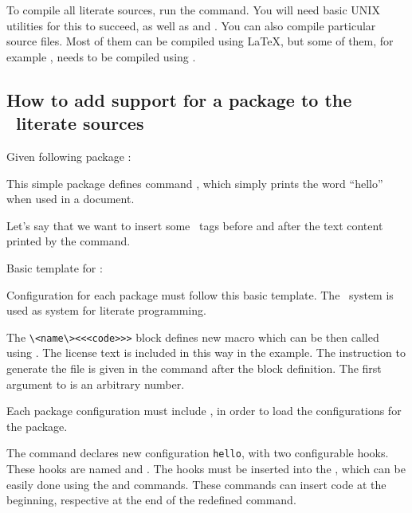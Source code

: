 To compile all literate sources, run the  command. You will need basic UNIX utilities 
for this to succeed, as well as  and . You can also compile particular source
files. Most of them can be compiled using \LaTeX, but some of them, for example , needs
to be compiled using .

\subsection{How to add support for a package to the \texfourht\ literate sources}

Given following package :


This simple package defines command \texcommand{\hello}, which simply prints the word \enquote{hello} when used in a document.

Let's say that we want to insert some \HTML\ tags before and after the text content printed by the command.

Basic template for :


Configuration for each package must follow this basic template. The \ProTeX\ system is used as system for literate programming.

The \verb|\<name\><<<code>>>| block defines new macro which can be then called using . The license text
is included in this way in the example. The instruction to generate the  file is given in the 
command  after the block definition. The first argument to  is an arbitrary number.


Each package configuration  must include , in order to load the configurations for the package.

The command  declares new configuration \texttt{hello}, with two configurable hooks. 
These hooks are named   and . The hooks must be inserted into the 
\texcommand{\hello}, which can be easily done using the  and  commands. These
commands can insert code  at the beginning, respective at the end of the redefined command.

